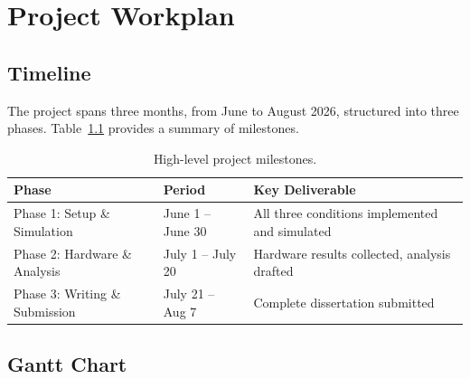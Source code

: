 \documentclass[]{UCD_CS_FYP_Report}
\begin{document}
\chapter{Project Workplan}

\section{Timeline}

The project spans three months, from June to August 2026, structured into three phases. Table~\ref{tab:timeline} provides a summary of milestones.

\begin{table}[h]
\centering
\caption{High-level project milestones.}
\label{tab:timeline}
\begin{tabular}{lll}
\toprule
\textbf{Phase} & \textbf{Period} & \textbf{Key Deliverable} \\
\midrule
Phase 1: Setup \& Simulation & June 1 -- June 30 & All three conditions implemented and simulated \\
Phase 2: Hardware \& Analysis & July 1 -- July 20 & Hardware results collected, analysis drafted \\
Phase 3: Writing \& Submission & July 21 -- Aug 7 & Complete dissertation submitted \\
\bottomrule
\end{tabular}
\end{table}

\section{Gantt Chart}
\end{document}
